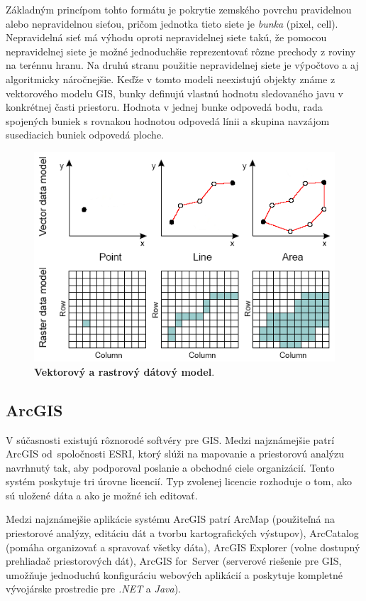 Základným princípom tohto formátu je pokrytie zemského povrchu pravidelnou alebo nepravidelnou sieťou, pričom jednotka tieto siete je \emph{bunka} (pixel, cell). Nepravidelná sieť má výhodu oproti nepravidelnej siete takú, že pomocou nepravidelnej siete je možné jednoduchšie reprezentovať rôzne prechody z roviny na terénnu hranu. Na druhú stranu použitie nepravidelnej siete je výpočtovo a aj algoritmicky náročnejšie. Keďže v tomto modeli neexistujú objekty známe z vektorového modelu GIS, bunky definujú vlastnú hodnotu sledovaného javu v konkrétnej časti priestoru. Hodnota v jednej bunke odpovedá bodu, rada spojených buniek s rovnakou hodnotou odpovedá línii a skupina navzájom susediacich buniek odpovedá ploche.

\begin{figure}[ht]
    \centering
    \includegraphics[width=0.5\linewidth]{obrazky-figures/vector-and-raster-data.png}
    \caption{\textbf{Vektorový a rastrový dátový model}\protect\footnotemark.}
    \label{fig:vectorandraster}
\end{figure}


\subsection{ArcGIS}
V súčasnosti existujú rôznorodé softvéry pre GIS. Medzi najznámejšie patrí ArcGIS od~spoločnosti ESRI, ktorý slúži na mapovanie a priestorovú analýzu navrhnutý tak, aby podporoval poslanie a obchodné ciele organizácií. Tento systém poskytuje tri úrovne licencií. Typ zvolenej licencie rozhoduje o tom, ako sú uložené dáta a ako je možné ich editovať. 

Medzi najznámejšie aplikácie systému ArcGIS patrí ArcMap (použiteľná na priestorové analýzy, editáciu dát a tvorbu kartografických výstupov), ArcCatalog (pomáha organizovať a spravovať všetky dáta), ArcGIS Explorer (volne dostupný prehliadač priestorových dát), ArcGIS for~Server (serverové riešenie pre GIS, umožňuje jednoduchú konfiguráciu webových aplikácií a poskytuje kompletné vývojárske prostredie pre \emph{.NET} a \emph{Java}).

